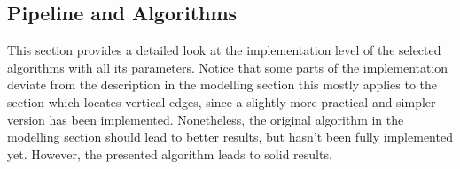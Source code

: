 \subsection{Pipeline and Algorithms}\label{subsec:pipeline}

This section provides a detailed look at the implementation level of the selected algorithms
with all its parameters.
Notice that some parts of the implementation deviate from the description in the modelling section
this mostly applies to the section which locates vertical edges, since a slightly more practical
and simpler version has been implemented. Nonetheless, the original algorithm in the modelling
section should lead to better results, but hasn't been fully implemented yet.
However, the presented algorithm leads to solid results.



